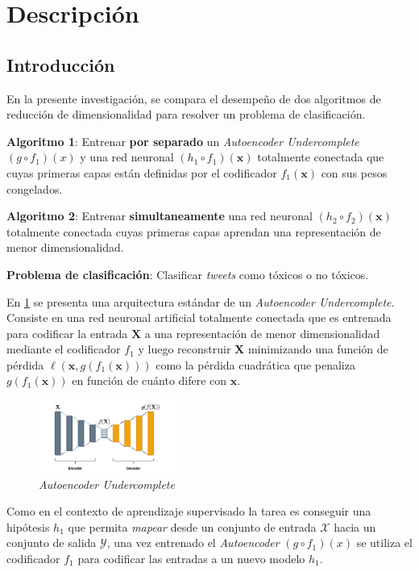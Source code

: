 \section{Descripción}

\subsection{Introducción}

En la presente investigación, se compara el desempeño de dos algoritmos de reducción de dimensionalidad para resolver un problema de clasificación.

\textbf{Algoritmo 1}: Entrenar \textbf{por separado} un \textit{Autoencoder Undercomplete} $(g \circ f_1)(x)$ y una red neuronal $(h_1 \circ f_1)(\bm{x})$ totalmente conectada que cuyas primeras capas están definidas por el codificador $f_1(\bm{x})$ con sus pesos congelados.

\textbf{Algoritmo 2}: Entrenar \textbf{simultaneamente} una red neuronal $(h_2 \circ f_2)(\bm{x})$ totalmente conectada cuyas primeras capas aprendan una representación de menor dimensionalidad.

\textbf{Problema de clasificación}: Clasificar \textit{tweets} como tóxicos o no tóxicos.

En \ref{fig:autoencoder} se presenta una arquitectura estándar de un \textit{Autoencoder Undercomplete}. Consiste en una red neuronal artificial totalmente conectada que es entrenada para codificar la entrada $\mathbf{X}$ a una representación de menor dimensionalidad mediante el codificador $f_1$ y luego reconstruir $\mathbf{X}$ minimizando una función de pérdida $\ell(\bm{x},g(f_1(\bm{x})))$ como la pérdida cuadrática que penaliza $g(f_1(\bm{x}))$ en función de cuánto difere con $\bm{x}$.

\begin{figure}[h]
\centering
\includegraphics[width=0.4\textwidth]{autoencoder}
\caption{\label{fig:autoencoder} \textit{Autoencoder Undercomplete}}
\end{figure}

Como en el contexto de aprendizaje supervisado la tarea es conseguir una hipótesis $h_1$ que permita \textit{mapear} desde un conjunto de entrada $\mathcal{X}$ hacia un conjunto de salida $\mathcal{Y}$, una vez entrenado el \textit{Autoencoder} $(g \circ f_1)(x)$ se utiliza el codificador $f_1$ para codificar las entradas a un nuevo modelo $h_{1}$. 


